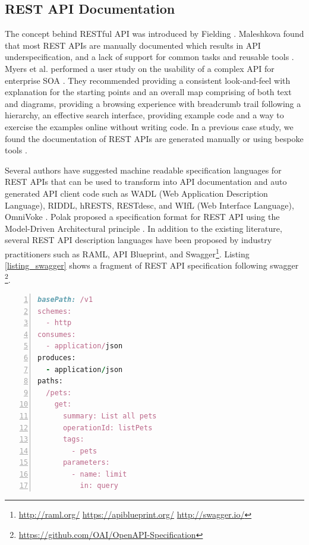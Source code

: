 \subsection{REST API Documentation} %
The concept behind RESTful API was introduced by Fielding \cite{Fielding_rest}. Maleshkova found that most REST APIs are manually documented which results in API underspecification, and a lack of support for common tasks and reusable tools \cite{Maleshkova_investigating}. Myers et al. performed a user study on the usability of a complex API for enterprise SOA \cite{Myers_study}. They recommended providing a consistent look-and-feel with explanation for the starting points and an overall map comprising of both text and diagrams, providing a browsing experience with breadcrumb trail following a hierarchy, an effective search interface, providing example code and a way to exercise the examples online without writing code. In a previous case study, we found the documentation of REST APIs are generated manually or using bespoke tools \cite{sohan2015case}.

Several authors have suggested machine readable specification languages for REST APIs that can be used to transform into API documentation and auto generated API client code such as WADL (Web Application Description Language), RIDDL, hRESTS, RESTdesc, and WIfL (Web Interface Language), OmniVoke \cite{hadley2006web, mangler2010origin,Kopecky_hrests,RESTdesc,Danielsen_validation,Ning_omnivoke}. Polak proposed a specification format for REST API using the Model-Driven Architectural principle \cite{Polak:2015:RAM:2790798.2790820}. In addition to the existing literature, several REST API description languages have been proposed by industry practitioners such as RAML, API Blueprint, and Swagger\footnote{ \url{http://raml.org/} \url{https://apiblueprint.org/} \url{http://swagger.io/}}. Listing \ref{listing_swagger} shows a fragment of REST API specification following swagger \footnote{\url{https://github.com/OAI/OpenAPI-Specification}}.

\lstset{basicstyle=\footnotesize}
\begin{lstlisting}[language=Ruby,breaklines=true,showspaces=false,showstringspaces=false,numbers=left,xleftmargin=2em,caption={Example Swagger REST API Specification},label=listing_swagger]
basePath: /v1
schemes:
  - http
consumes:
  - application/json
produces:
  - application/json
paths:
  /pets:
    get:
      summary: List all pets
      operationId: listPets
      tags:
        - pets
      parameters:
        - name: limit
          in: query
\end{lstlisting}


